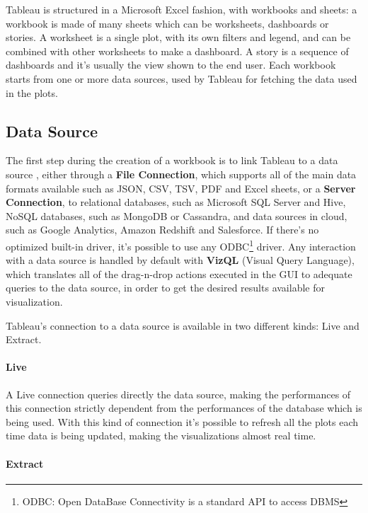 Tableau is structured in a Microsoft Excel fashion, with workbooks and sheets: a workbook is made of many sheets which can be worksheets, dashboards or stories. A worksheet is a single plot, with its own filters and legend, and can be combined with other worksheets to make a dashboard. A story is a sequence of dashboards and it's usually the view shown to the end user. Each workbook starts from one or more data sources, used by Tableau for fetching the data used in the plots.

\subsection{Data Source}

The first step during the creation of a workbook is to link Tableau to a data source \cite{LearningTableau}, either through a \textbf{File Connection}, which supports all of the main data formats available such as JSON, CSV, TSV, PDF and Excel sheets, or a \textbf{Server Connection}, to relational databases, such as Microsoft SQL Server and Hive, NoSQL databases, such as MongoDB or Cassandra, and data sources in cloud, such as Google Analytics, Amazon Redshift and Salesforce. If there's no optimized built-in driver, it's possible to use any ODBC\footnote{ODBC: Open DataBase Connectivity is a standard API to access DBMS} driver. Any interaction with a data source is handled by default with \textbf{VizQL} (Visual Query Language), which translates all of the drag-n-drop actions executed in the GUI to adequate queries to the data source, in order to get the desired results available for visualization.

Tableau's connection to a data source is available in two different kinds: Live and Extract.

\paragraph{Live}

A Live connection queries directly the data source, making the performances of this connection strictly dependent from the performances of the database which is being used. With this kind of connection it's possible to refresh all the plots each time data is being updated, making the visualizations almost real time.

\paragraph{Extract}

